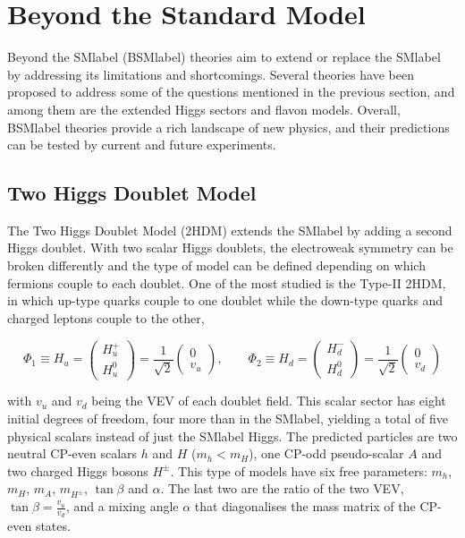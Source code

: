 \section{Beyond the Standard Model}
\label{section:BSM}

Beyond the \acrshort{SMlabel} (\acrshort{BSMlabel}) theories aim to extend or replace the \acrshort{SMlabel} by addressing its limitations and shortcomings. Several theories have been proposed to address some of the questions mentioned in the previous section, and among them are the extended Higgs sectors and flavon models. Overall, \acrshort{BSMlabel} theories provide a rich landscape of new physics, and their predictions can be tested by current and future experiments.

\subsection{Two Higgs Doublet Model}

The Two Higgs Doublet Model (2HDM) extends the \acrshort{SMlabel} by adding a second Higgs doublet. With two scalar Higgs doublets, the electroweak symmetry can be broken differently and the type of model can be defined depending on which fermions couple to each doublet. One of the most studied is the Type-II 2HDM, in which up-type quarks couple to one doublet while the down-type quarks and charged leptons couple to the other,

\begin{equation}
    \Phi_1\equiv H_u = 
    \begin{pmatrix} H^+_u \\ H^0_u \end{pmatrix} =
    \frac{1}{\sqrt{2}}
    \begin{pmatrix} 0 \\ v_u \end{pmatrix},
    \qquad
    \Phi_2\equiv H_d = 
    \begin{pmatrix} H^-_d \\ H^0_d \end{pmatrix} =
    \frac{1}{\sqrt{2}}
    \begin{pmatrix} 0 \\ v_d \end{pmatrix}
\end{equation}

with $v_u$ and $v_d$ being the \acrshort{VEV} of each doublet field. This scalar sector has eight initial degrees of freedom, four more than in the \acrshort{SMlabel}, yielding a total of five physical scalars instead of just the \acrshort{SMlabel} Higgs. The predicted particles are two neutral CP-even scalars $h$ and $H$ ($m_h < m_H$), one CP-odd pseudo-scalar $A$ and two charged Higgs bosons $H^\pm$. This type of models have six free parameters: $m_h$, $m_H$, $m_A$, $m_{H^\pm}$, $\tan\beta$ and $\alpha$. The last two are the ratio of the two \acrshort{VEV}, $\tan\beta=\frac{v_u}{v_d}$, and a mixing angle $\alpha$ that diagonalises the mass matrix of the CP-even states. 

